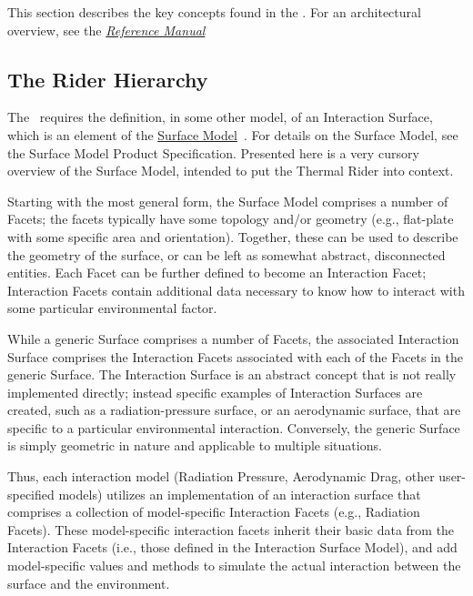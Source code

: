 %
%
% 
%


This section describes the key concepts found in the \ThermalRiderDesc.
For an
architectural overview, see the 
\href{file:refman.pdf} {\em Reference Manual}
\cite{thermalbib:ReferenceManual}


\subsection{The Rider Hierarchy}
The \ThermalRiderDesc\ requires the definition, in some other model, of an Interaction
Surface, which is an element of the
\href{file:\JEODHOME/models/utils/surface\_model/docs/surface\_model.pdf}{Surface
Model}~\cite{dynenv:SURFACEMODEL}.  For
details on the Surface Model, see the Surface Model Product
Specification.  Presented here is a very cursory overview of the
Surface Model, intended to put the Thermal Rider into context.

Starting with the most general form, the Surface Model comprises a number of Facets; the facets typically have some topology and/or geometry (e.g., flat-plate with some specific area and orientation).  Together, these can be used to describe the geometry of the surface, or can be left as somewhat abstract, disconnected entities.  Each Facet can be further defined to become an Interaction Facet; Interaction Facets contain additional data necessary to know how to interact with some particular environmental factor.

While a generic Surface comprises a number of Facets, the associated Interaction Surface comprises the Interaction Facets associated with each of the Facets in the generic Surface.  The Interaction Surface is an abstract concept that is not really implemented directly; instead specific examples of Interaction Surfaces are created, such as a radiation-pressure surface, or an aerodynamic surface, that are specific to a particular environmental interaction.  Conversely, the generic Surface is simply geometric in nature and applicable to multiple situations. 

Thus, each interaction model (Radiation Pressure, Aerodynamic Drag, other
user-specified models) utilizes an implementation of an interaction surface that comprises a collection of model-specific Interaction Facets (e.g., Radiation Facets).  These model-specific
interaction facets inherit their basic data from the Interaction Facets (i.e.,
those defined in the Interaction Surface Model), and add model-specific values
and methods to simulate the actual interaction between the surface and the
environment.

